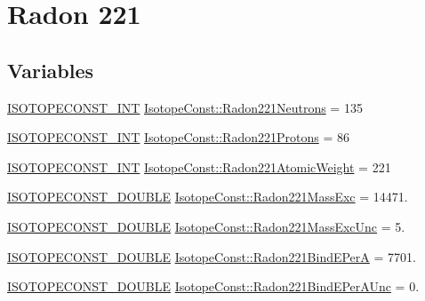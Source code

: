 \hypertarget{group___isotope_const-_radon-_rn221}{}\section{Radon 221}
\label{group___isotope_const-_radon-_rn221}
\subsection*{Variables}
\begin{DoxyCompactItemize}
\item 
\mbox{\hyperlink{group___isotope_const-_macros_ga5f18360b3e99483a35c32d789e62621c}{I\+S\+O\+T\+O\+P\+E\+C\+O\+N\+S\+T\+\_\+\+I\+NT}} \mbox{\hyperlink{group___isotope_const-_radon-_rn221_ga99c25c3d5001e80f2a70e4a7f0e7fb4b}{Isotope\+Const\+::\+Radon221\+Neutrons}} = 135
\item 
\mbox{\hyperlink{group___isotope_const-_macros_ga5f18360b3e99483a35c32d789e62621c}{I\+S\+O\+T\+O\+P\+E\+C\+O\+N\+S\+T\+\_\+\+I\+NT}} \mbox{\hyperlink{group___isotope_const-_radon-_rn221_ga1f437e9d1aa4a2e8a9f1eadbbb99b385}{Isotope\+Const\+::\+Radon221\+Protons}} = 86
\item 
\mbox{\hyperlink{group___isotope_const-_macros_ga5f18360b3e99483a35c32d789e62621c}{I\+S\+O\+T\+O\+P\+E\+C\+O\+N\+S\+T\+\_\+\+I\+NT}} \mbox{\hyperlink{group___isotope_const-_radon-_rn221_ga37b5378f6ce64cf6ec059b1b8c4ba5f3}{Isotope\+Const\+::\+Radon221\+Atomic\+Weight}} = 221
\item 
\mbox{\hyperlink{group___isotope_const-_macros_ga8f45a7272ce02c0b4c65c44636ed719a}{I\+S\+O\+T\+O\+P\+E\+C\+O\+N\+S\+T\+\_\+\+D\+O\+U\+B\+LE}} \mbox{\hyperlink{group___isotope_const-_radon-_rn221_ga2db7446721cd48c82cbaa415d36bb501}{Isotope\+Const\+::\+Radon221\+Mass\+Exc}} = 14471.
\item 
\mbox{\hyperlink{group___isotope_const-_macros_ga8f45a7272ce02c0b4c65c44636ed719a}{I\+S\+O\+T\+O\+P\+E\+C\+O\+N\+S\+T\+\_\+\+D\+O\+U\+B\+LE}} \mbox{\hyperlink{group___isotope_const-_radon-_rn221_ga9c0c6e9f6d5b8331c73d9d643a28c095}{Isotope\+Const\+::\+Radon221\+Mass\+Exc\+Unc}} = 5.
\item 
\mbox{\hyperlink{group___isotope_const-_macros_ga8f45a7272ce02c0b4c65c44636ed719a}{I\+S\+O\+T\+O\+P\+E\+C\+O\+N\+S\+T\+\_\+\+D\+O\+U\+B\+LE}} \mbox{\hyperlink{group___isotope_const-_radon-_rn221_ga5a5116347ce255d85098885548e73ec7}{Isotope\+Const\+::\+Radon221\+Bind\+E\+PerA}} = 7701.
\item 
\mbox{\hyperlink{group___isotope_const-_macros_ga8f45a7272ce02c0b4c65c44636ed719a}{I\+S\+O\+T\+O\+P\+E\+C\+O\+N\+S\+T\+\_\+\+D\+O\+U\+B\+LE}} \mbox{\hyperlink{group___isotope_const-_radon-_rn221_gabf13152d196f8ae9cb30b6b83639b88b}{Isotope\+Const\+::\+Radon221\+Bind\+E\+Per\+A\+Unc}} = 0.

\end{DoxyCompactItemize}
